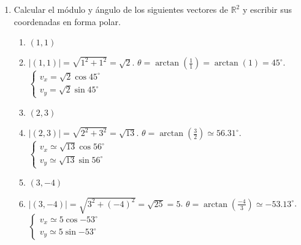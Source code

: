 \documentclass[a4paper]{article}
\newcommand{\answer}{\item[**]}
\newcommand{\exercise}{\item}
\newcommand{\SEL}[1]{ \left\{\begin{matrix} #1 \end{matrix}\right. }
\newcommand{\df}[2]{\displaystyle\frac{#1}{#2}}
\newcommand{\degs}{^{\circ}}
\begin{document}
\begin{enumerate}
\begin{multicols}{2}
\begin{enumerate} [label=(\alph*)]
		\item $\vec{v} + \vec{u}$ con $\vec{v}=(-1,3)$ y $\vec{u}=(1,3)$
		\answer $\vec{v} + \vec{u} = (-1,3) + (1,3) = (0,6)$

		\item $(4,-1)+(3,3)+(-2,0)$
		\answer $(4,-1)+(3,3)+(-2,0) = (5,2)$

		\item $(3,1)-(2,4)$
		\answer $(3,1)-(2,4) = (1,-3)$

		\item $\vec{a} - \vec{b}$ y $\vec{b} - \vec{a}$ con $\vec{a}=(-1,2)$ y $\vec{b}=(1,2)$
		\answer $\vec{a} - \vec{b} = (-1,2) - (1,2) = (-2,0)$. $\vec{b} - \vec{a} = (1,2) - (-1,2) = (2,0)$

		\item $\left(\vec{v}+\vec{u}\right)-\vec{w}$ con $\vec{v}=(1,2)$, $\vec{u}=(2,1)$ y $\vec{w}=(1,1)$
		\answer $\left(\vec{v}+\vec{u}\right)-\vec{w} = (1,2)+(2,1)-(1,1) = (2,2)$

		\item $(2,0,0)+(0,3,0)+(0,0,1)$
		\answer $(2,0,0)+(0,3,0)+(0,0,1) = (2,3,1)$

		\item $(2,2,0)+(0,-1,1)$
		\answer $(2,2,0)+(0,-1,1) = (2,1,1)$

		\item $(1,-1,0)-(-2,-1,3)$
		\answer $(1,-1,0)-(-2,-1,3) = (3,0,-3)$

	\end{enumerate}
	\end{multicols}

	\exercise Calcular el módulo y ángulo de los siguientes vectores de $\mathbb{R}^2$ y escribir sus coordenadas en forma polar.
	\begin{multicols}{2}
	\begin{enumerate} [label=(\alph*)]
		
		\item $(1,1)$
		\answer $|(1,1)| = \sqrt{1^2+1^2} = \sqrt{2}$. $\theta=\arctan\left(\df{1}{1}\right) = \arctan(1) = 45\degs$. $\SEL{v_x=\sqrt{2} \cos{45\degs} \\ v_y=\sqrt{2} \sin{45\degs} }$

		\item $(2,3)$
		\answer $|(2,3)| = \sqrt{2^2+3^2} = \sqrt{13}$. $\theta=\arctan\left(\df{3}{2}\right) \simeq 56.31\degs$.  $\SEL{v_x \simeq\sqrt{13} \cos{56\degs} \\ v_y\simeq\sqrt{13} \sin{56\degs} }$

		\item $(3,-4)$
		\answer $|(3,-4)| = \sqrt{3^2+(-4)^2} = \sqrt{25} = 5$. $\theta=\arctan\left(\df{-4}{3}\right) \simeq -53.13\degs$. $\SEL{v_x \simeq 5 \cos{-53\degs} \\ v_y\simeq5 \sin{-53\degs} }$


\end{enumerate}
\end{multicols}
\end{enumerate}
\end{document}
